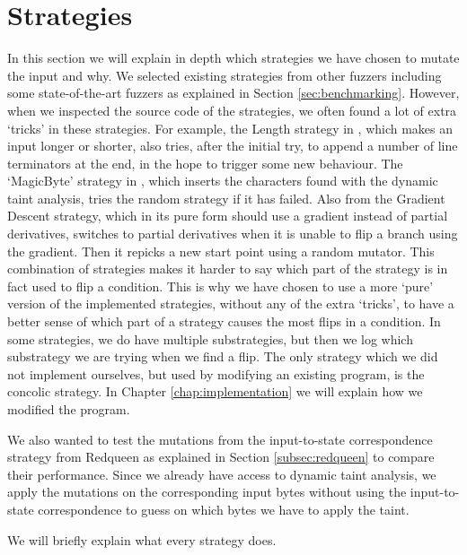 \section{Strategies}\label{sec:implement-strategies}
In this section we will explain in depth which strategies we have chosen to mutate the input and why. 
We selected existing strategies from other fuzzers including some state-of-the-art fuzzers as explained in Section \ref{sec:benchmarking}.
However, when we inspected the source code of the strategies, we often found a lot of extra `tricks' in these strategies. For example, the Length strategy in \cite{chen2018angora}, which makes an input longer or shorter, also tries, after the initial try, to append a number of line terminators at the end, in the hope to trigger some new behaviour.
The `MagicByte' strategy in \cite{chen2018angora}, which inserts the characters found with the dynamic taint analysis, tries the random strategy if it has failed. Also from \cite{chen2018angora} the Gradient Descent strategy, which in its pure form should use a gradient instead of partial derivatives, switches to partial derivatives when it is unable to flip a branch using the gradient. Then it repicks a new start point using a random mutator. This combination of strategies makes it harder to say which part of the strategy is in fact used to flip a condition.
This is why we have chosen to use a more `pure' version of the implemented strategies, without any of the extra `tricks', to have a better sense of which part of a strategy causes the most flips in a condition. In some strategies, we do have multiple substrategies, but then we log which substrategy we are trying when we find a flip.
The only strategy which we did not implement ourselves, but used by modifying an existing program, is the concolic strategy. In Chapter \ref{chap:implementation} we will explain how we modified the program.

We also wanted to test the mutations from the input-to-state correspondence strategy from Redqueen as explained in Section \ref{subsec:redqueen} to compare their performance. Since we already have access to dynamic taint analysis, we apply the mutations on the corresponding input bytes without using the input-to-state correspondence to guess on which bytes we have to apply the taint. %

We will briefly explain what every strategy does.

